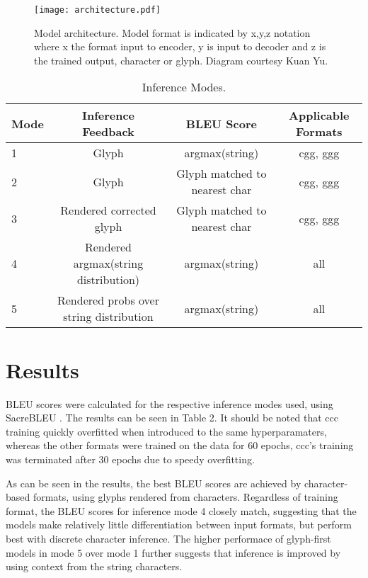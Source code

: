 \documentclass{article}
\begin{document}
\begin{SCfigure}
\centering
\texttt{[image: architecture.pdf]}
\caption[]{\label{fig:arch} Model architecture. Model format is indicated by x,y,z notation where x the format input to encoder, y is input to decoder and z is the trained output, character or glyph. Diagram courtesy Kuan Yu.}
\end{SCfigure}

\begin{table}
  \centering
  \caption{Inference Modes.}
  \begin{tabular}{lccc}
    \toprule
    \cmidrule(r){1-2}
    Mode  & Inference Feedback & BLEU Score & Applicable Formats\\ 
    \midrule
    1     & Glyph  & argmax(string)   & cgg, ggg  \\
    2     & Glyph & Glyph matched to nearest char & cgg, ggg    \\
    3     & Rendered corrected glyph & Glyph matched to nearest char & cgg, ggg  \\
    4     & Rendered argmax(string distribution) & argmax(string) & all\\
    5     & Rendered probs over string distribution & argmax(string) & all\\
    \bottomrule
  \end{tabular}
  \label{tab:table1}
\end{table}

\section{Results}

BLEU scores were calculated for the respective inference modes used, using SacreBLEU \cite{bleu}. The results can be seen in Table 2. It should be noted that ccc training quickly overfitted when introduced to the same hyperparamaters, whereas the other formats were trained on the data for 60 epochs, ccc's training was terminated after 30 epochs due to speedy overfitting.

As can be seen in the results, the best BLEU scores are achieved by character-based formats, using glyphs rendered from characters. Regardless of training format, the BLEU scores for inference mode 4 closely match, suggesting that the models make relatively little differentiation between input formats, but perform best with discrete character inference. The higher performace of glyph-first models in mode 5 over mode 1 further suggests that inference is improved by using context from the string characters.
\end{document}
